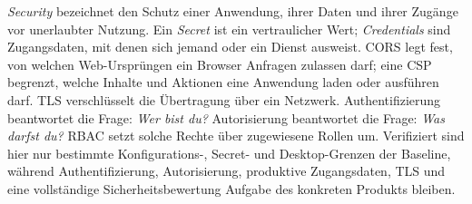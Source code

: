 \begin{beginnerstatement}

\emph{Security} bezeichnet den Schutz einer Anwendung, ihrer Daten und ihrer
Zugänge vor unerlaubter Nutzung. Ein \emph{Secret} ist ein vertraulicher Wert;
\emph{Credentials} sind Zugangsdaten, mit denen sich jemand oder ein Dienst
ausweist. CORS legt fest, von welchen Web-Ursprüngen ein Browser Anfragen
zulassen darf; eine CSP begrenzt, welche Inhalte und Aktionen eine Anwendung
laden oder ausführen darf. TLS verschlüsselt die Übertragung über ein Netzwerk.
Authentifizierung beantwortet die Frage: \emph{Wer bist du?} Autorisierung
beantwortet die Frage: \emph{Was darfst du?} RBAC setzt solche Rechte über
zugewiesene Rollen um. Verifiziert sind hier nur bestimmte Konfigurations-,
Secret- und Desktop-Grenzen der Baseline, während Authentifizierung,
Autorisierung, produktive Zugangsdaten, TLS und eine vollständige
Sicherheitsbewertung Aufgabe des konkreten Produkts bleiben.

\end{beginnerstatement}
